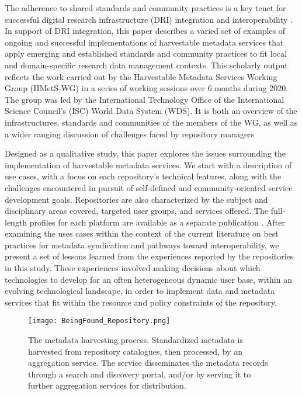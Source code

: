 \documentclass{interact}
\begin{document}
The adherence to shared standards and community practices is a key tenet for successful digital research infrastructure (DRI) integration and interoperability \parencite{dietze_iterative_2018, yu_coevolution_2021, waide_demystifying_2017}. In support of DRI integration, this paper describes a varied set of examples of ongoing and successful implementations of harvestable metadata services that apply emerging and established standards and community practices to fit local and domain-specific research data management contexts. This scholarly output reflects the work carried out by the Harvestable Metadata Services Working Group (HMetS-WG) in a series of working sessions over 6 months during 2020. The group was led by the International Technology Office  of the International Science Council's (ISC) World Data System (WDS). It is both an overview of the infrastructures, standards and communities of the members of the WG, as well as a wider ranging discussion of challenges faced by repository managers

Designed as a qualitative study, this paper explores the issues surrounding the implementation of harvestable metadata services. We start with a description of use cases, with a focus on each repository's technical features, along with the challenges encountered in pursuit of self-defined and community-oriented service development goals. Repositories are also characterized by the subject and disciplinary areas covered, targeted user groups, and services offered. The full-length profiles for each platform are available as a separate publication \parencite{urquidi_diaz_harvestable_2022}. After examining the uses cases within the context of the current literature on best practices for metadata syndication and pathways toward interoperability, we present a set of lessons learned from the experiences reported by the repositories in this study. These experiences involved making decisions about which technologies to develop for an often heterogeneous dynamic user base, within an evolving technological landscape, in order to implement data and metadata services that fit within the resource and policy constraints of the repository.

\begin{figure}
\centering
\texttt{[image: BeingFound\_Repository.png]}
\caption{The metadata harvesting process. Standardized metadata is harvested from repository catalogues, then processed, by an aggregation service. The service disseminates the metadata records through a search and discovery portal, and/or by serving it to further aggregation services for distribution.} \label{image-harvesting}
\end{figure}
\end{document}

